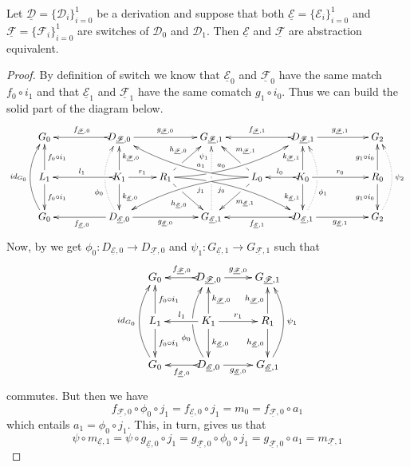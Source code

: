 \documentclass[a4paper,UKenglish,cleveref,pdftex, thm-restate,numberwithinsect,anonymous]{lipics}
\newcommand{\id}[1]{\mathsf{id}_{#1}}
\newcommand{\dder}[1]{\mathscr{#1}}
\newcommand{\der}[1]{\underline{\dder{#1}}}
\begin{document}
\begin{lemma}
  \label{thm:switch_uni}
  Let $\der{D}=\{\dder{D}_{i}\}_{i=0}^1$ be a derivation and suppose
  that both $\der{E}=\{\dder{E}_i\}_{i=0}^1$ and
  $\der{F}=\{\dder{F}_i\}_{i=0}^1$ are switches of $\dder{D}_0$ and
  $\dder{D}_1$. Then $\der{E}$ and $\der{F}$ are abstraction
  equivalent.
\end{lemma}

\begin{proof}
    By definition of switch we know that $\der{E}_0$ and $\der{F}_0$ have the same match $f_0\circ i_1$ and that $\der{E}_1$ and $\der{F}_1$ have the same comatch $g_1\circ i_0$. Thus we can build the solid part of the diagram below.
    \[\xymatrix@C=22pt{G_{0} && \ar@{>->}[ll]_{f_{\der{F},0}} D_{\der{F},0} \ar[rr]^{g_{\der{F},0}}&& G_{\der{F},1} && \ar@{>->}[ll]_{f_{\der{F},1}} D_{\der{F},1} \ar[rr]^{g_{\der{F},1}}&& G_{2}\\L_1 \ar[d]^{f_0\circ i_1} \ar[u]_{f_0\circ i_1}&& K_{1} \ar[d]^{k_{\der{E},0}} \ar[u]_{k_{\der{F},0}}\ar@{>->}[ll]_{l_1} \ar[r]^{r_1} & R_{1} \ar@/^.35cm/[drrr]|(.3)\hole_(.4){j_0} \ar[dr]|(.3)\hole_{h_{\der{E},0}} \ar@/_.35cm/[urrr]|(.3)\hole^(.4){a_0} \ar[ur]|(.3)\hole^{h_{\der{F},0}}& &L_{0} \ar@/_.35cm/[dlll]^(.4){j_1} \ar[dl]|(.3)\hole^{m_{\der{E},1}} \ar@/^.35cm/[ulll]_(.4){a_1} \ar[ul]|(.3)\hole_{m_{\der{F},1}}& K_{0} \ar[d]_{k_{\der{E},1}} \ar[u]^{k_{\der{F},1}}\ar@{>->}[l]_{l_{0}} \ar[rr]^{r_0} && R_{0} \ar[d]_{g_1\circ i_0} \ar[u]^{g_1\circ i_0}\\ \ar@/^.5cm/[uu]^{\id{G_0}} G_{0} && \ar[ll]^{f_{\der{E},0}} D_{\der{E},0} \ar@{.>}@/^.5cm/[uu]^(.33){\phi_{0}}|\hole \ar[rr]_{g_{\der{E},0}}&& G_{\der{E},1} \ar@{.>}[uu]^(.76){\psi_1}|(.45)\hole |(.55)\hole&& \ar@{>->}[ll]^{f_{\der{E},1}} D_{\der{E},1} \ar@{.>}@/_.5cm/[uu]_(.33){\phi_{1}}|\hole\ar[rr]_{g_{\der{E},1}}&& G_{2}\ar@{.>}@/_.5cm/[uu]_{\psi_2}}\]
    Now, by  we get $\phi_0\colon D_{\der{E},0}\to D_{\der{F},0}$ and $\psi_1 \colon G_{\der{E},1}\to G_{\der{F},1}$ such that
    \[\xymatrix{G_{0} & \ar@{>->}[l]_{f_{\der{F},0}} D_{\der{F},0} \ar[r]^{g_{\der{F},0}}& G_{\der{F},1} \\L_1 \ar[d]^{f_0\circ i_1} \ar[u]_{f_0\circ i_1}& K_{1} \ar[d]^{k_{\der{E},0}} \ar[u]_{k_{\der{F},0}}\ar[l]_{l_1} \ar[r]^{r_1} & R_{1}  \ar[d]_{h_{\der{E},0}}  \ar[u]^{h_{\der{F},0}}\\ \ar@/^.5cm/[uu]^{\id{G_0}} G_{0} & \ar@{>->}[l]^{f_{\der{E},0}} D_{\der{E},0} \ar@/^.5cm/[uu]^(.33){\phi_{0}}|\hole \ar[r]_{g_{\der{E},0}}& G_{\der{E},1} \ar@/_.5cm/[uu]_{\psi_1}}\]
    commutes. But then we have
    \[
      f_{\der{F},0}\circ \phi_0\circ j_1=f_{\der{E},0} \circ j_1=m_0=f_{\der{F},0}\circ a_1\]
    which entails $a_1= \phi_0\circ j_1$. This, in turn, gives us that
    \[\psi\circ m_{\der{E},1}=\psi \circ g_{\der{E},0}\circ j_1=g_{\der{F},0}\circ \phi_0\circ j_1=g_{\der{F},0}\circ a_1=m_{\der{F},1}\]
    

\end{proof}
\end{document}
